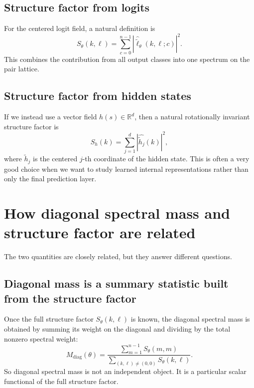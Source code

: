 \documentclass[11pt]{article}
\newcommand{\R}{\mathbb{R}}
\newcommand{\diag}{\mathrm{diag}}
\begin{document}
\subsection{Structure factor from logits}

For the centered logit field, a natural definition is
\begin{equation}
    S_\theta(k,\ell) = \sum_{c=0}^{n-1} \left|\widehat{\widetilde{\ell}}_\theta(k,\ell;c)\right|^2.
\end{equation}
This combines the contribution from all output classes into one spectrum on the pair lattice.

\subsection{Structure factor from hidden states}

If we instead use a vector field $h(s) \in \R^d$, then a natural rotationally invariant structure factor is
\begin{equation}
    S_h(k) = \sum_{j=1}^{d} \left| \widehat{\widetilde{h}_j}(k) \right|^2,
\end{equation}
where $\widetilde{h}_j$ is the centered $j$-th coordinate of the hidden state. This is often a very good choice when we want to study learned internal representations rather than only the final prediction layer.

\section{How diagonal spectral mass and structure factor are related}

The two quantities are closely related, but they answer different questions.

\subsection{Diagonal mass is a summary statistic built from the structure factor}

Once the full structure factor $S_\theta(k,\ell)$ is known, the diagonal spectral mass is obtained by summing its weight on the diagonal and dividing by the total nonzero spectral weight:
\begin{equation}
    M_{\diag}(\theta)
    = \frac{\sum_{m=1}^{n-1} S_\theta(m,m)}{\sum_{(k,\ell)\neq(0,0)} S_\theta(k,\ell)}.
\end{equation}
So diagonal spectral mass is not an independent object. It is a particular scalar functional of the full structure factor.
\end{document}
